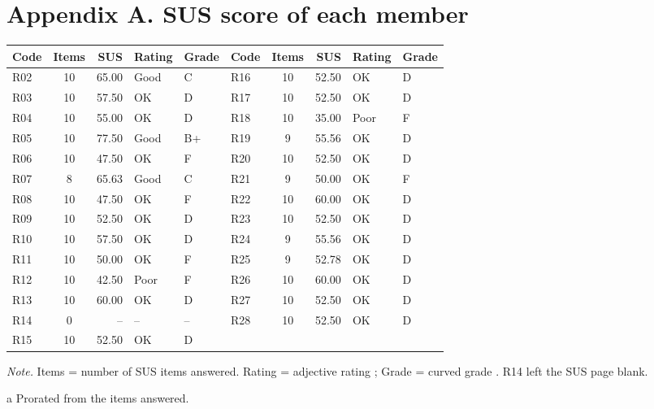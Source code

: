 \documentclass[11pt,a4paper]{article}
\begin{document}
\appendix
\section*{Appendix A. SUS score of each member}

\begin{table}[H]
\centering
\begin{threeparttable}
\small
\setlength{\tabcolsep}{5pt}
\begin{tabular}{lcrll@{\hspace{2.2em}}lcrll}
\toprule
Code & Items & SUS & Rating & Grade & Code & Items & SUS & Rating & Grade\\
\midrule
R02 & 10 & 65.00 & Good & C & R16 & 10 & 52.50 & OK & D\\
R03 & 10 & 57.50 & OK & D & R17 & 10 & 52.50 & OK & D\\
R04 & 10 & 55.00 & OK & D & R18 & 10 & 35.00 & Poor & F\\
R05 & 10 & 77.50 & Good & B+ & R19 & 9 & 55.56\tnote{a} & OK & D\\
R06 & 10 & 47.50 & OK & F & R20 & 10 & 52.50 & OK & D\\
R07 & 8 & 65.63\tnote{a} & Good & C & R21 & 9 & 50.00\tnote{a} & OK & F\\
R08 & 10 & 47.50 & OK & F & R22 & 10 & 60.00 & OK & D\\
R09 & 10 & 52.50 & OK & D & R23 & 10 & 52.50 & OK & D\\
R10 & 10 & 57.50 & OK & D & R24 & 9 & 55.56\tnote{a} & OK & D\\
R11 & 10 & 50.00 & OK & F & R25 & 9 & 52.78\tnote{a} & OK & D\\
R12 & 10 & 42.50 & Poor & F & R26 & 10 & 60.00 & OK & D\\
R13 & 10 & 60.00 & OK & D & R27 & 10 & 52.50 & OK & D\\
R14 & 0 & -- & -- & -- & R28 & 10 & 52.50 & OK & D\\
R15 & 10 & 52.50 & OK & D & & & & & \\
\bottomrule
\end{tabular}
\begin{tablenotes}\footnotesize
\item \textit{Note.} Items = number of SUS items answered. Rating = adjective rating \citep{bangor2009}; Grade = curved grade \citep{sauro2016}. R14 left the SUS page blank.
\item[a] Prorated from the items answered.
\end{tablenotes}
\end{threeparttable}
\end{table}
\end{document}
